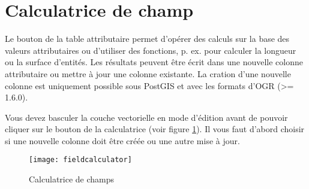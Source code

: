 \section{Calculatrice de champ}\label{sec:field_calculator}

Le bouton  de la table attributaire permet d'opérer des calculs sur la base des valeurs attributaires ou d'utiliser des fonctions, p. ex. pour calculer la longueur ou la surface d'entités. Les résultats peuvent être écrit dans une nouvelle colonne attributaire ou mettre à jour une colonne existante. La cration d'une nouvelle colonne est uniquement possible sous PostGIS et avec les formats d'OGR (>= 1.6.0).

Vous devez basculer la couche vectorielle en mode d'édition avant de pouvoir cliquer sur le bouton de la calculatrice (voir figure \ref{fig:field_calculator}). Il vous faut d'abord choisir si une nouvelle colonne doit être créée ou une autre mise à jour.

\begin{figure}[ht]
  \centering
    \texttt{[image: fieldcalculator]}
    \caption{Calculatrice de champs \nixcaption}\label{fig:field_calculator}
\end{figure}

